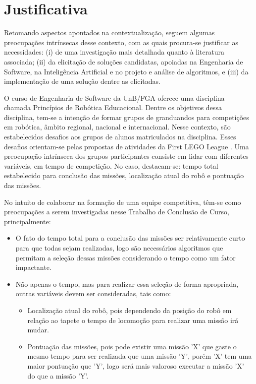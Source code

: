 \section{Justificativa}

Retomando aspectos apontados na contextualização, seguem algumas preocupações intrínsecas desse contexto, com as quais procura-se justificar as necessidades: (i) de uma investigação mais detalhada quanto à literatura associada; (ii) da elicitação de soluções candidatas, apoiadas na Engenharia de Software, na Inteligência Artificial e no projeto e análise de algoritmos, e (iii) da implementação de uma solução dentre as elicitadas.

O curso de Engenharia de Software da UnB/FGA oferece uma disciplina chamada Princípios de Robótica Educacional. Dentre os objetivos dessa disciplina, tem-se a intenção de formar grupos de granduandos para competições em robótica, âmbito regional, nacional e internacional. Nesse contexto, são estabelecidos desafios aos grupos de alunos matriculados na disciplina. Esses desafios orientam-se pelas propostas de atividades da First LEGO League \cite{kamenfirst}. Uma preocupação intrínseca dos grupos participantes consiste em lidar com diferentes variáveis, em tempo de competição. No caso, destacam-se: tempo total estabelecido para conclusão das missões, localização atual do robô e pontuação das missões.

No intuito de colaborar na formação de uma equipe competitiva, têm-se como preocupações a serem investigadas nesse Trabalho de Conclusão de Curso, principalmente:

\begin{itemize}
\item O fato do tempo total para a conclusão das missões ser relativamente curto para que todas sejam realizadas, logo são necessários algoritmos que permitam a seleção dessas missões considerando o tempo como um fator impactante.

\item Não apenas o tempo, mas para realizar essa seleção de forma apropriada, outras variáveis devem ser consideradas, tais como: 
\begin{itemize}
\item Localização atual do robô, pois dependendo da posição do robô em relação ao tapete o tempo de locomoção para realizar uma missão irá mudar.   
\item Pontuação das missões, pois pode existir uma missão 'X' que gaste o mesmo tempo para ser realizada que uma missão 'Y', porém 'X' tem uma maior pontuação que 'Y', logo será mais valoroso executar a missão 'X' do que a missão 'Y'.
\end{itemize} 
\end{itemize}
 

